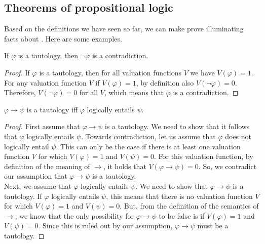 \documentclass[nobib,nofonts]{tufte-handout}
\newcommand{\proplog}{\acro{PropLog}}
\begin{document}
\subsection{Theorems of propositional logic}

Based on the definitions we have seen so far, we can make prove illuminating facts about \proplog.
Here are some examples.

\begin{proposition}
 If $\varphi$ is a tautology, then $\neg \varphi$ is a contradiction.
\end{proposition}

\begin{proof}
  If $\varphi$ is a tautology, then for all valuation functions $V$ we have $V(\varphi) = 1$. For any valuation function $V$ if $V(\varphi) = 1$, by definition also $V(\neg \varphi) = 0$. Therefore, $V(\neg \varphi) = 0$ for all $V$, which means that $\varphi$ is a contradiction.
\end{proof}

\begin{proposition}
 $\varphi \rightarrow \psi$ is a tautology iff $\varphi$ logically entails $\psi$.
\end{proposition}

\begin{proof}
  First assume that $\varphi \rightarrow \psi$ is a tautology. We need to show that it follows that $\varphi$ logically entails $\psi$. Towards contradiction, let us assume that $\varphi$ does not logically entail $\psi$. This can only be the case if there is at least one valuation function $V$ for which $V(\varphi) = 1$ and $V(\psi) = 0$. For this valuation function, by definition of the meaning of $\rightarrow$, it holds that $V(\varphi \rightarrow \psi)=0$. So, we contradict our assumption that $\varphi \rightarrow \psi$ is a tautology. \\
  Next, we assume that $\varphi$ logically entails $\psi$. We need to show that $\varphi \rightarrow \psi$ is a tautology. If $\varphi$ logically entails $\psi$, this means that there is no valuation function $V$ for which $V(\varphi)=1$ and $V(\psi)=0$. But, from the definition of the semantics of $\rightarrow$, we know that the only possibility for $\varphi \rightarrow \psi$ to be false is if $V(\varphi)=1$ and $V(\psi)=0$. Since this is ruled out by our assumption, $\varphi \rightarrow \psi$ must be a tautology.
\end{proof}
\end{document}
